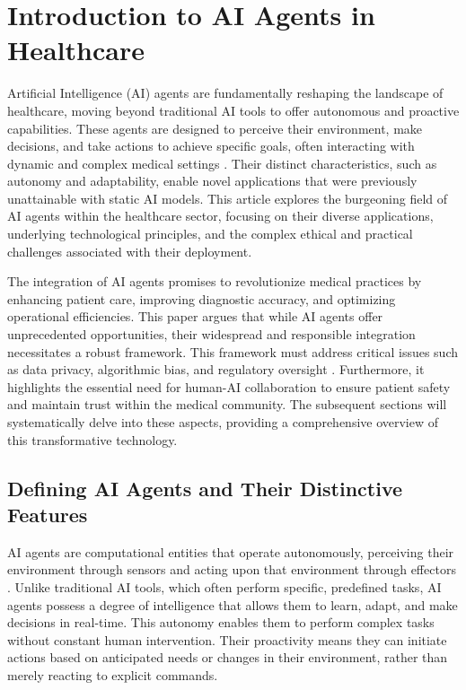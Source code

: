 \documentclass[12pt,a4paper]{article}
\begin{document}
\section{Introduction to AI Agents in Healthcare}
\label{sec:introduction}
Artificial Intelligence (AI) agents are fundamentally reshaping the landscape of healthcare, moving beyond traditional AI tools to offer autonomous and proactive capabilities. These agents are designed to perceive their environment, make decisions, and take actions to achieve specific goals, often interacting with dynamic and complex medical settings \cite{russell2010artificial}. Their distinct characteristics, such as autonomy and adaptability, enable novel applications that were previously unattainable with static AI models. This article explores the burgeoning field of AI agents within the healthcare sector, focusing on their diverse applications, underlying technological principles, and the complex ethical and practical challenges associated with their deployment.

The integration of AI agents promises to revolutionize medical practices by enhancing patient care, improving diagnostic accuracy, and optimizing operational efficiencies. This paper argues that while AI agents offer unprecedented opportunities, their widespread and responsible integration necessitates a robust framework. This framework must address critical issues such as data privacy, algorithmic bias, and regulatory oversight \cite{topol2019deep}. Furthermore, it highlights the essential need for human-AI collaboration to ensure patient safety and maintain trust within the medical community. The subsequent sections will systematically delve into these aspects, providing a comprehensive overview of this transformative technology.

\subsection{Defining AI Agents and Their Distinctive Features}
\label{subsec:defining-ai-agents}
AI agents are computational entities that operate autonomously, perceiving their environment through sensors and acting upon that environment through effectors \cite{russell2010artificial}. Unlike traditional AI tools, which often perform specific, predefined tasks, AI agents possess a degree of intelligence that allows them to learn, adapt, and make decisions in real-time. This autonomy enables them to perform complex tasks without constant human intervention. Their proactivity means they can initiate actions based on anticipated needs or changes in their environment, rather than merely reacting to explicit commands.
\end{document}
